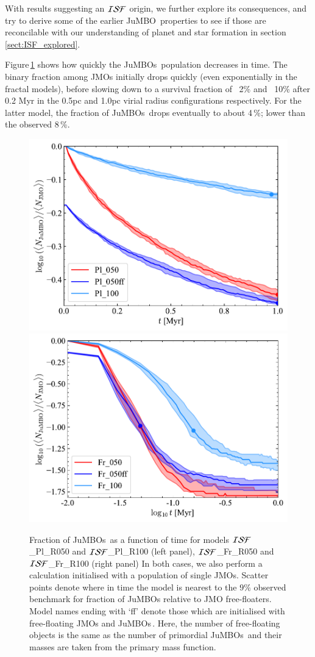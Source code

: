 \documentclass[submission,phys]{lib/SciPost}
\newcommand{\jumbo}{\mbox{JuMBO}}
\newcommand{\jumbos}{\mbox{JuMBOs}}
\begin{document}
With results suggesting an ${\cal ISF}$ origin, we further
explore its consequences, and try to derive some of the earlier
\jumbo\, properties to see if those are reconcilable with our
understanding of planet and star formation in
section\,\ref{sect:ISF_explored}.

Figure\,\ref{Fig:Fjumbo_vs_time_model_ISF_Fr} shows how quickly the
\jumbos\, population decreases in time. The binary
fraction among JMOs initially drops quickly (even
exponentially in the fractal models), before slowing down to a survival 
fraction of ~2\% and ~10\% after 0.2 Myr in the 0.5pc and 1.0pc virial 
radius configurations respectively. For the latter model, the fraction of 
\jumbos\, drops eventually to about 4\,\%; lower than the observed 8\,\%.

\begin{figure}
    \centering
    \includegraphics[width=0.49\columnwidth]{figures/Plummer_General_fJuMBO_evol.pdf}
    \includegraphics[width=0.49\columnwidth]{figures/Fractal_General_fJuMBO_evol.pdf}
    \caption{Fraction of \jumbos\ as a function of time for models
      ${\cal ISF}$\_Pl\_R050 and ${\cal ISF}$\_Pl\_R100 (left panel), ${\cal ISF}$\_Fr\_R050
      and ${\cal ISF}$\_Fr\_R100 (right panel) In both cases, we also perform a calculation 
      initialised with a population of single JMOs. Scatter points denote where in time the model is 
      nearest to the $9\%$ observed benchmark for fraction of JuMBOs relative to JMO free-floaters.
      Model names ending with `ff' denote those which are initialised with free-floating JMOs and
      \jumbos\,. Here, the number of free-floating  objects is the same as the number of primordial 
      \jumbos\, and their masses are taken from the primary mass function. 
}
        \label{Fig:Fjumbo_vs_time_model_ISF_Pl}
        \label{Fig:Fjumbo_vs_time_model_ISF_Fr}
\end{figure}
\end{document}
